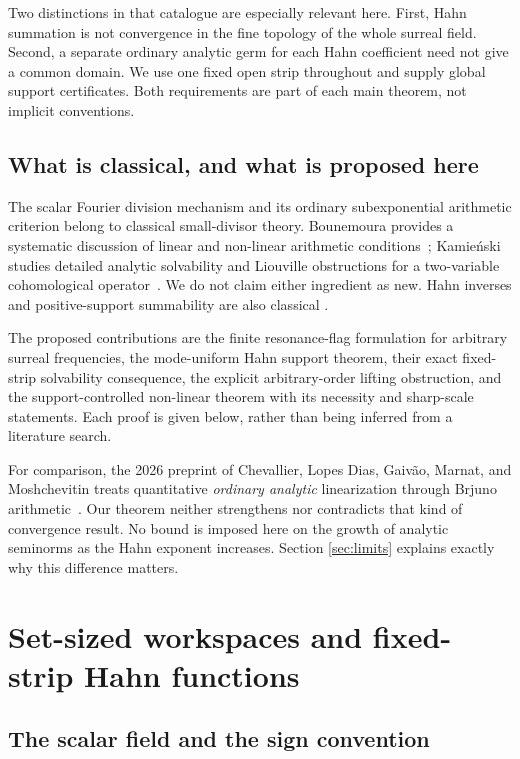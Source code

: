 \documentclass[11pt,letterpaper]{article}
\theoremstyle{definition}
\theoremstyle{remark}
\numberwithin{equation}{section}
\begin{document}
Two distinctions in that catalogue are especially relevant here.  First,
Hahn summation is not convergence in the fine topology of the whole surreal
field.  Second, a separate ordinary analytic germ for each Hahn coefficient
need not give a common domain.  We use one fixed open strip throughout and
supply global support certificates.  Both requirements are part of each main
theorem, not implicit conventions.

\subsection{What is classical, and what is proposed here}

The scalar Fourier division mechanism and its ordinary subexponential
arithmetic criterion belong to classical small-divisor theory.  Bounemoura
provides a systematic discussion of linear and non-linear arithmetic
conditions~\cite{bounemoura}; Kamie\'nski studies detailed analytic solvability
and Liouville obstructions for a two-variable cohomological
operator~\cite{kamen}.  We do not claim either ingredient as new.
Hahn inverses and positive-support summability are also classical
\cite{neumann,poonen}.

The proposed contributions are the finite resonance-flag formulation for
arbitrary surreal frequencies, the mode-uniform Hahn support theorem, their
exact fixed-strip solvability consequence, the explicit arbitrary-order
lifting obstruction, and the support-controlled non-linear theorem with its
necessity and sharp-scale statements.  Each proof is given below, rather than
being inferred from a literature search.

For comparison, the 2026 preprint of Chevallier, Lopes Dias, Gaiv\~ao, Marnat,
and Moshchevitin treats quantitative \emph{ordinary analytic} linearization
through Brjuno arithmetic~\cite{chevallier}.  Our theorem neither strengthens
nor contradicts that kind of convergence result.  No bound is imposed here on
the growth of analytic seminorms as the Hahn exponent increases.  Section
\ref{sec:limits} explains exactly why this difference matters.

\section{Set-sized workspaces and fixed-strip Hahn functions}
\label{sec:workspace}

\subsection{The scalar field and the sign convention}
\end{document}

